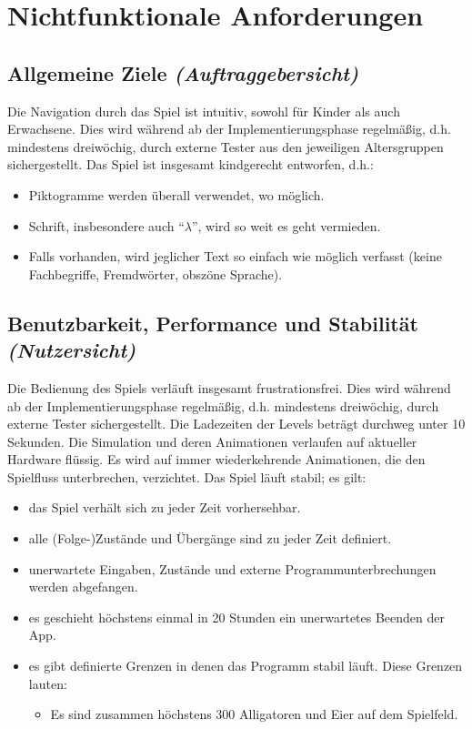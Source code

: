 \section{Nichtfunktionale Anforderungen}

\subsection{Allgemeine Ziele \textit{(Auftraggebersicht)}}
\begin{requirements}
	 Die Navigation durch das Spiel ist intuitiv, sowohl für Kinder als auch Erwachsene. Dies wird während ab der Implementierungsphase regelmäßig, d.h. mindestens dreiwöchig, durch externe Tester aus den jeweiligen Altersgruppen sichergestellt.
	 Das Spiel ist insgesamt kindgerecht entworfen, d.h.:
		\begin{itemize}
			\item Piktogramme werden überall verwendet, wo möglich.
			\item Schrift, insbesondere auch "`$\lambda$"', wird so weit es geht vermieden.
			\item Falls vorhanden, wird jeglicher Text so einfach wie möglich verfasst (keine Fachbegriffe, Fremdwörter, obszöne Sprache).
		\end{itemize}
\end{requirements}

\subsection{Benutzbarkeit, Performance und Stabilität \textit{(Nutzersicht)}}
\begin{requirements}
	 Die Bedienung des Spiels verläuft insgesamt frustrationsfrei. Dies wird während ab der Implementierungsphase regelmäßig, d.h. mindestens dreiwöchig, durch externe Tester sichergestellt.
	 Die Ladezeiten der Levels beträgt durchweg unter 10 Sekunden.
	 Die Simulation und deren Animationen verlaufen auf aktueller Hardware flüssig.
	 Es wird auf immer wiederkehrende Animationen, die den Spielfluss unterbrechen, verzichtet.
	 Das Spiel läuft stabil; es gilt:
		\begin{itemize}
			\item das Spiel verhält sich zu jeder Zeit vorhersehbar.
			\item alle (Folge-)Zustände und Übergänge sind zu jeder Zeit definiert.
			\item unerwartete Eingaben, Zustände und externe Programmunterbrechungen werden abgefangen.
			\item es geschieht höchstens einmal in 20 Stunden ein unerwartetes Beenden der App.
			\item es gibt definierte Grenzen in denen das Programm stabil läuft. Diese Grenzen lauten:
				\begin{itemize}
					\item Es sind zusammen höchstens 300 Alligatoren und Eier auf dem Spielfeld.
				\end{itemize}
		\end{itemize}
\end{requirements}

